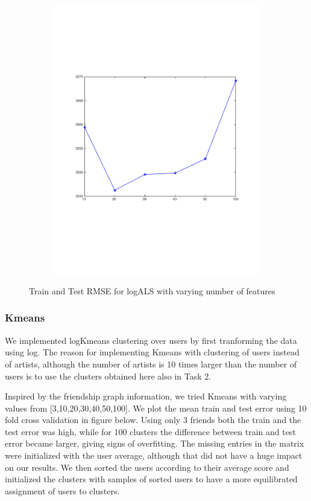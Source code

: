 \begin{figure}[h]
\begin{subfigure}[b]{0.45\textwidth}
    \includegraphics[width=\textwidth]{figures/als_test.pdf}
    \caption{}
  \end{subfigure}
  \caption{Train and Test RMSE for logALS with varying number of features}
  \label{fig:new_plot}
\end{figure}

\subsubsection{Kmeans}
We implemented logKmeans clustering over users by first tranforming the data using log.
The reason for implementing Kmeans with clustering of users 
instead of artists, although the number of artists is 10 times larger than the number of users is to use the clusters obtained here also in Task 2.

Inspired by the friendship graph information, we tried Kmeans with
varying values from [3,10,20,30,40,50,100]. We plot the mean train and test error using 10 fold cross validation in figure below. 
Using only 3 friends both the train and the test error was high, while for 100 clusters the difference between train and test error became larger, giving signs of overfitting.
The missing entries in the matrix were initialized with the user average, although that did not have a huge impact on our results. We then sorted the users according to their average score and initialized the clusters with samples of sorted users to have a more equilibrated assignment of users to clusters.

